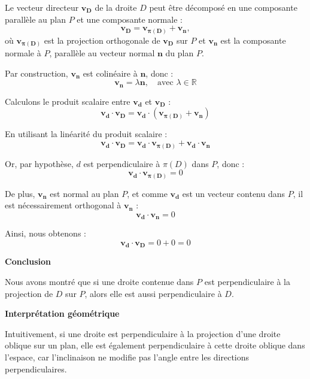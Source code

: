 \documentclass[10pt,a4paper]{article}
\begin{document}
\q Le vecteur directeur $\mathbf{v_D}$ de la droite $D$ peut être décomposé en une composante
parallèle au plan $P$ et une composante normale :
\[
\mathbf{v_D} = \mathbf{v_{\pi(D)}} + \mathbf{v_n},
\]
où $\mathbf{v_{\pi(D)}}$ est la projection orthogonale de $\mathbf{v_D}$ sur $P$ et $\mathbf{v_n}$
est la composante normale à $P$, parallèle au vecteur normal $\mathbf{n}$ du plan $P$.

Par construction, $\mathbf{v_n}$ est colinéaire à $\mathbf{n}$, donc :
\[
\mathbf{v_n} = \lambda \mathbf{n}, \quad \text{avec } \lambda \in \mathbb{R}
\]

\q Calculons le produit scalaire entre $\mathbf{v_d}$ et $\mathbf{v_D}$ :
\[
\mathbf{v_d} \cdot \mathbf{v_D} = \mathbf{v_d} \cdot (\mathbf{v_{\pi(D)}} + \mathbf{v_n})
\]

En utilisant la linéarité du produit scalaire :
\[
\mathbf{v_d} \cdot \mathbf{v_D} = \mathbf{v_d} \cdot \mathbf{v_{\pi(D)}} + \mathbf{v_d} \cdot \mathbf{v_n}
\]

Or, par hypothèse, $d$ est perpendiculaire à $\pi(D)$ dans $P$, donc :
\[
\mathbf{v_d} \cdot \mathbf{v_{\pi(D)}} = 0
\]

De plus, $\mathbf{v_n}$ est normal au plan $P$, et comme $\mathbf{v_d}$ est un vecteur contenu dans $P$, il est nécessairement orthogonal à $\mathbf{v_n}$ :
\[
\mathbf{v_d} \cdot \mathbf{v_n} = 0
\]

Ainsi, nous obtenons :
\[
\mathbf{v_d} \cdot \mathbf{v_D} = 0 + 0 = 0
\]

\textbf{Conclusion}

Nous avons montré que si une droite contenue dans $P$ est perpendiculaire à la projection de $D$ sur
$P$, alors elle est aussi perpendiculaire à $D$.

\textbf{Interprétation géométrique}

Intuitivement, si une droite est perpendiculaire à la projection d'une droite oblique sur un plan,
elle est également perpendiculaire à cette droite oblique dans l'espace, car l'inclinaison ne
modifie pas l'angle entre les directions perpendiculaires.
\end{document}
